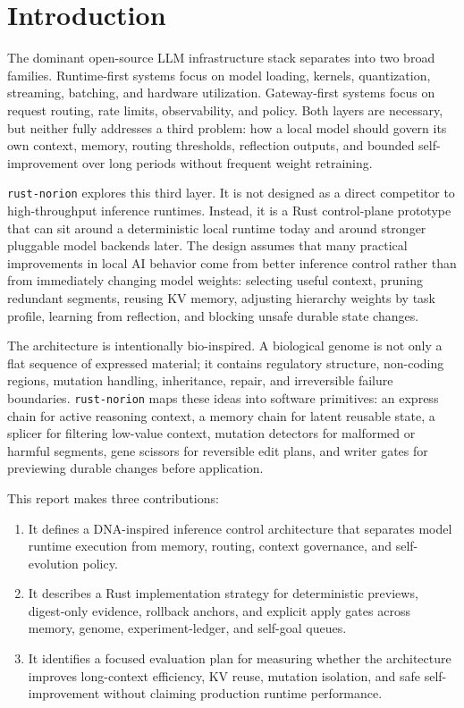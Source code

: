 \documentclass[10pt]{article}
\begin{document}
\section{Introduction}

The dominant open-source LLM infrastructure stack separates into two broad
families. Runtime-first systems focus on model loading, kernels, quantization,
streaming, batching, and hardware utilization. Gateway-first systems focus on
request routing, rate limits, observability, and policy. Both layers are
necessary, but neither fully addresses a third problem: how a local model
should govern its own context, memory, routing thresholds, reflection outputs,
and bounded self-improvement over long periods without frequent weight
retraining.

\texttt{rust-norion} explores this third layer. It is not designed as a direct
competitor to high-throughput inference runtimes. Instead, it is a Rust
control-plane prototype that can sit around a deterministic local runtime today
and around stronger pluggable model backends later. The design assumes that
many practical improvements in local AI behavior come from better inference
control rather than from immediately changing model weights: selecting useful
context, pruning redundant segments, reusing KV memory, adjusting hierarchy
weights by task profile, learning from reflection, and blocking unsafe durable
state changes.

The architecture is intentionally bio-inspired. A biological genome is not only
a flat sequence of expressed material; it contains regulatory structure,
non-coding regions, mutation handling, inheritance, repair, and irreversible
failure boundaries. \texttt{rust-norion} maps these ideas into software
primitives: an express chain for active reasoning context, a memory chain for
latent reusable state, a splicer for filtering low-value context, mutation
detectors for malformed or harmful segments, gene scissors for reversible edit
plans, and writer gates for previewing durable changes before application.

This report makes three contributions:

\begin{enumerate}[leftmargin=*]
  \item It defines a DNA-inspired inference control architecture that separates
  model runtime execution from memory, routing, context governance, and
  self-evolution policy.
  \item It describes a Rust implementation strategy for deterministic previews,
  digest-only evidence, rollback anchors, and explicit apply gates across
  memory, genome, experiment-ledger, and self-goal queues.
  \item It identifies a focused evaluation plan for measuring whether the
  architecture improves long-context efficiency, KV reuse, mutation isolation,
  and safe self-improvement without claiming production runtime performance.
\end{enumerate}
\end{document}
